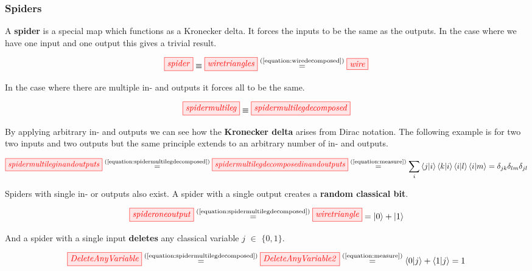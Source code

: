\documentclass[]{article}
\newcommand{\equaltext}[1]{\ensuremath{\stackrel{\text{#1}}{=}}}
\begin{document}
\subsubsection{Spiders}
\label{spiders}

A \textbf{spider} is a special map which functions as a Kronecker delta. It forces the inputs to be the same as the outputs. In the case where we have one input and one output this gives a trivial result.

\begin{equation}
\label{equation:boringspider}
\tikzfig{spider} \equiv \tikzfig{wiretriangles} \equaltext{(\ref{equation:wiredecomposed})} \tikzfig{wire}
\end{equation}

In the case where there are multiple in- and outputs it forces all to be the same.

\begin{equation}
\label{equation:spidermultilegdecomposed}
\tikzfig{spidermultileg} \equiv \tikzfig{spidermultilegdecomposed}
\end{equation}

By applying arbitrary in- and outputs we can see how the \textbf{Kronecker delta} arises from Dirac notation. The following example is for two two inputs and two outputs but the same principle extends to an arbitrary number of in- and outputs.

\begin{equation}
\begin{split}
\tikzfig{spidermultileginandoutputs} \equaltext{(\ref{equation:spidermultilegdecomposed})} \tikzfig{spidermultilegdecomposedinandoutputs} \equaltext{(\ref{equation:measure})} \sum_{i} \bra{j}\ket{i}\bra{k}\ket{i}\bra{i}\ket{l}\bra{i}\ket{m} = \delta_{jk} \delta_{lm}  \delta_{jl}
\end{split}
\end{equation}

Spiders with single in- or outputs also exist. A spider with a single output creates a 
\textbf{random classical bit}.

\begin{equation}
\label{equation:spideroneoutput}
\tikzfig{spideroneoutput} \equaltext{(\ref{equation:spidermultilegdecomposed})} \tikzfig{wiretriangle} = \ket{0} + \ket{1}
\end{equation}

And a spider with a single input \textbf{deletes} any classical variable $j$ $\in$ $\{0,1\}$.

\begin{equation}
\label{equation:deleteanyvariable}
 \tikzfig{DeleteAnyVariable} \equaltext{(\ref{equation:spidermultilegdecomposed})} \tikzfig{DeleteAnyVariable2} \equaltext{(\ref{equation:measure})}  \bra{0}\ket{j} + \bra{1}\ket{j} = 1
\end{equation}
\end{document}

